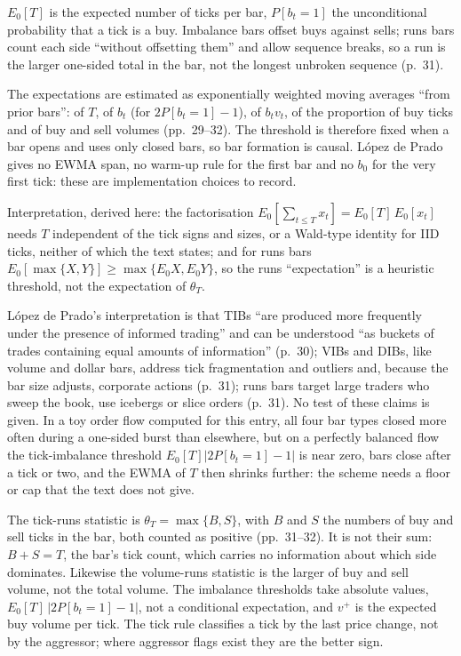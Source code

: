\begin{qfmethod}
 $E_0[T]$ is the expected number of ticks per bar, $P[b_t=1]$ the unconditional probability that a tick is a buy. Imbalance bars offset buys against sells; runs bars count each side ``without offsetting them'' and allow sequence breaks, so a run is the larger one-sided total in the bar, not the longest unbroken sequence (p.~31).

 The expectations are estimated as exponentially weighted moving averages ``from prior bars'': of $T$, of $b_t$ (for $2P[b_t=1]-1$), of $b_tv_t$, of the proportion of buy ticks and of buy and sell volumes (pp.~29--32). The threshold is therefore fixed when a bar opens and uses only closed bars, so bar formation is causal. López de Prado gives no EWMA span, no warm-up rule for the first bar and no $b_0$ for the very first tick: these are implementation choices to record.

Interpretation, derived here: the factorisation $E_0[\sum_{t\le T}x_t]=E_0[T]\,E_0[x_t]$ needs $T$ independent of the tick signs and sizes, or a Wald-type identity for IID ticks, neither of which the text states; and for runs bars $E_0[\max\{X,Y\}]\ge\max\{E_0X,E_0Y\}$, so the runs ``expectation'' is a heuristic threshold, not the expectation of $\theta_T$.

 López de Prado's interpretation is that TIBs ``are produced more frequently under the presence of informed trading'' and can be understood ``as buckets of trades containing equal amounts of information'' (p.~30); VIBs and DIBs, like volume and dollar bars, address tick fragmentation and outliers and, because the bar size adjusts, corporate actions (p.~31); runs bars target large traders who sweep the book, use icebergs or slice orders (p.~31). No test of these claims is given. In a toy order flow computed for this entry, all four bar types closed more often during a one-sided burst than elsewhere, but on a perfectly balanced flow the tick-imbalance threshold $E_0[T]|2P[b_t=1]-1|$ is near zero, bars close after a tick or two, and the EWMA of $T$ then shrinks further: the scheme needs a floor or cap that the text does not give.

 The tick-runs statistic is $\theta_T=\max\{B,S\}$, with $B$ and $S$ the numbers of buy and sell ticks in the bar, both counted as positive (pp.~31--32). It is not their sum: $B+S=T$, the bar's tick count, which carries no information about which side dominates. Likewise the volume-runs statistic is the larger of buy and sell volume, not the total volume. The imbalance thresholds take absolute values, $E_0[T]\,|2P[b_t=1]-1|$, not a conditional expectation, and $v^+$ is the expected buy volume per tick. The tick rule classifies a tick by the last price change, not by the aggressor; where aggressor flags exist they are the better sign.


\end{qfmethod}
